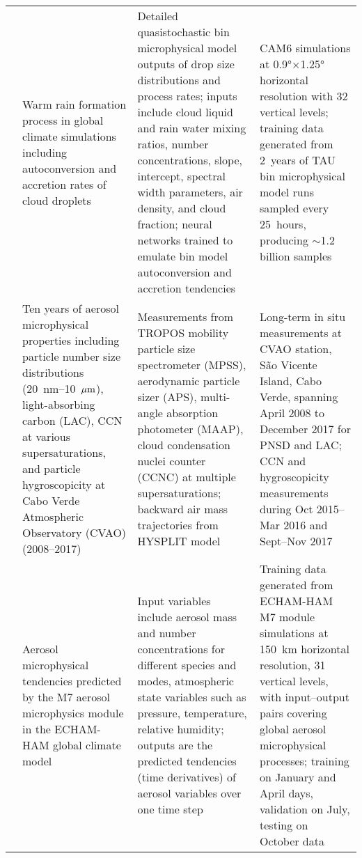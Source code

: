 \documentclass[11pt]{article}
\begin{document}
\begin{landscape}
\begin{longtable}{>{\raggedright\arraybackslash}p{2cm} 
        >{\raggedright\arraybackslash}p{4cm} 
        >{\raggedright\arraybackslash}p{10cm} 
        >{\raggedright\arraybackslash}p{6cm}}
\citet{gettelman2021machine} & Warm rain formation process in global climate simulations including autoconversion and accretion rates of cloud droplets & Detailed quasistochastic bin microphysical model outputs of drop size distributions and process rates; inputs include cloud liquid and rain water mixing ratios, number concentrations, slope, intercept, spectral width parameters, air density, and cloud fraction; neural networks trained to emulate bin model autoconversion and accretion tendencies & CAM6 simulations at 0.9°$\times$1.25° horizontal resolution with 32 vertical levels; training data generated from 2~years of TAU bin microphysical model runs sampled every 25~hours, producing $\sim$1.2 billion samples \\[6pt]

\citet{gong2022understanding} & Ten years of aerosol microphysical properties including particle number size distributions (20~nm–10~\(\mu \rm m\)), light-absorbing carbon (LAC), CCN at various supersaturations, and particle hygroscopicity at Cabo Verde Atmospheric Observatory (CVAO) (2008–2017) & Measurements from TROPOS mobility particle size spectrometer (MPSS), aerodynamic particle sizer (APS), multi-angle absorption photometer (MAAP), cloud condensation nuclei counter (CCNC) at multiple supersaturations; backward air mass trajectories from HYSPLIT model & Long-term in situ measurements at CVAO station, São Vicente Island, Cabo Verde, spanning April 2008 to December 2017 for PNSD and LAC; CCN and hygroscopicity measurements during Oct 2015–Mar 2016 and Sept–Nov 2017 \\[6pt]

\citet{harder2022physics} & Aerosol microphysical tendencies predicted by the M7 aerosol microphysics module in the ECHAM-HAM global climate model & Input variables include aerosol mass and number concentrations for different species and modes, atmospheric state variables such as pressure, temperature, relative humidity; outputs are the predicted tendencies (time derivatives) of aerosol variables over one time step & Training data generated from ECHAM-HAM M7 module simulations at 150~km horizontal resolution, 31 vertical levels, with input–output pairs covering global aerosol microphysical processes; training on January and April days, validation on July, testing on October data \\[6pt]


\end{longtable}
\end{landscape}
\end{document}
